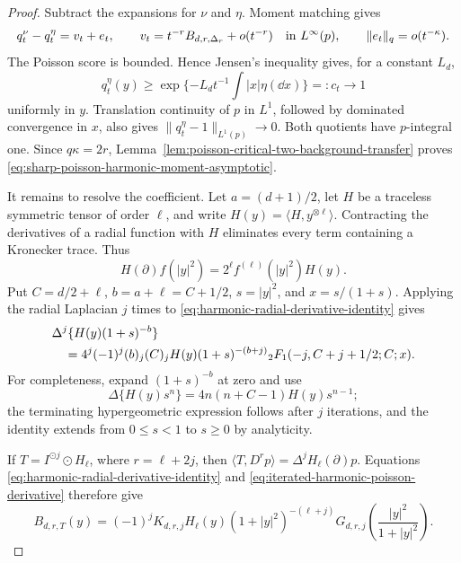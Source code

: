 \begin{proof}
Subtract the expansions for \(\nu\) and \(\eta\).  Moment matching gives
\[
 q_t^\nu-q_t^\eta=v_t+e_t,
 \qquad
 v_t=t^{-r}B_{d,r,\Delta_r}+o(t^{-r})
 \quad\hbox{in }L^\infty(p),
 \qquad \|e_t\|_q=o(t^{-\kappa}).
\]
The Poisson score is bounded.  Hence Jensen's inequality gives, for a
constant \(L_d\),
\[
 q_t^\eta(y)\ge \exp\{-L_d t^{-1}\textstyle\int|x|\eta(\dd x)\}
 =:c_t\longrightarrow1
\]
uniformly in \(y\).  Translation continuity of \(p\) in \(L^1\), followed
by dominated convergence in \(x\), also gives
\(\|q_t^\eta-1\|_{L^1(p)}\to0\).  Both quotients have \(p\)-integral one.
Since \(q\kappa=2r\), Lemma~\ref{lem:poisson-critical-two-background-transfer}
proves \eqref{eq:sharp-poisson-harmonic-moment-asymptotic}.

It remains to resolve the coefficient.  Let
\(a=(d+1)/2\), let \(H\) be a traceless symmetric tensor of order
\(\ell\), and write \(H(y)=\langle H,y^{\otimes\ell}\rangle\).  Contracting
the derivatives of a radial function with \(H\) eliminates every term
containing a Kronecker trace.  Thus
\begin{equation}\label{eq:harmonic-radial-derivative-identity}
 H(\partial)f(|y|^2)=2^\ell f^{(\ell)}(|y|^2)H(y).
\end{equation}
Put \(C=d/2+\ell\), \(b=a+\ell=C+1/2\),
\(s=|y|^2\), and \(x=s/(1+s)\).  Applying the radial Laplacian \(j\)
times to \eqref{eq:harmonic-radial-derivative-identity} gives
\begin{align}
 &\Delta^j\{H(y)(1+s)^{-b}\}\notag\\
 &\quad=4^j(-1)^j(b)_j(C)_jH(y)(1+s)^{-(b+j)}
 {}_2F_1(-j,C+j+1/2;C;x).
 \label{eq:iterated-harmonic-poisson-derivative}
\end{align}
For completeness, expand \((1+s)^{-b}\) at zero and use
\[
 \Delta\{H(y)s^n\}=4n(n+C-1)H(y)s^{n-1};
\]
the terminating hypergeometric expression follows after \(j\) iterations,
and the identity extends from \(0\le s<1\) to \(s\ge0\) by analyticity.

If \(T=I^{\odot j}\odot H_\ell\), where \(r=\ell+2j\), then
\(\langle T,D^rp\rangle=\Delta^jH_\ell(\partial)p\).  Equations
\eqref{eq:harmonic-radial-derivative-identity} and
\eqref{eq:iterated-harmonic-poisson-derivative} therefore give
\begin{equation}\label{eq:poisson-harmonic-mode-explicit}
 B_{d,r,T}(y)=(-1)^jK_{d,r,j}H_\ell(y)
 (1+|y|^2)^{-(\ell+j)}G_{d,r,j}
 \left(\frac{|y|^2}{1+|y|^2}\right).
\end{equation}


\end{proof}
